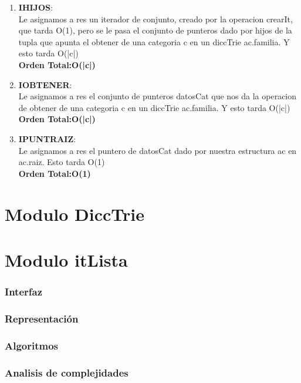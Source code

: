\documentclass[10pt, a4paper]{article}
\begin{document}
\begin{enumerate}
     \item \textbf{IHIJOS}:\\ Le asignamos a res un iterador de conjunto, creado por la operacion crearIt, que tarda O(1), pero se le pasa el conjunto de punteros dado por hijos de la tupla que apunta el obtener de una categoria c en un diccTrie ac.familia. Y esto tarda O(|c|)\\
	\textbf{Orden Total:}\textbf{O(|c|)}

     \item \textbf{IOBTENER}:\\ Le asignamos a res el conjunto de punteros datosCat que nos da la operacion de obtener de una categoria c en un diccTrie ac.familia. Y esto tarda O(|c|)\\
	\textbf{Orden Total:}\textbf{O(|c|)}

     \item \textbf{IPUNTRAIZ}:\\ Le asignamos a res el puntero de datosCat dado por nuestra estructura ac en ac.raiz. Esto tarda O(1)\\
	\textbf{Orden Total:}\textbf{O(1)}       

    \end{enumerate}
		

\newpage
\section{Modulo DiccTrie}



\newpage
\section{Modulo itLista}
\subsubsection{Interfaz}

\subsubsection{Representaci\'on}

\subsubsection{Algoritmos}

\subsubsection{Analisis de complejidades}

\end{document}

